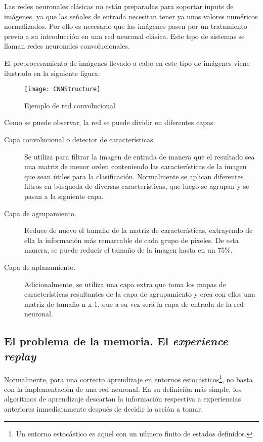\documentclass[11pt,spanish,listoffigures,listoftables]{tfgetsinf}
\begin{document}
Las redes neuronales clásicas no están preparadas para soportar inputs de imágenes, ya que las señales de entrada necesitan tener ya unos valores numéricos normalizados. Por ello es necesario que las imágenes pasen por un tratamiento previo a su introducción en una red neuronal clásica. Este tipo de sistemas se llaman redes neuronales convolucionales.

El preprocesamiento de imágenes llevado a cabo en este tipo de imágenes viene ilustrado en la siguiente figura:

\begin{figure}[h]
	\centering
	\texttt{[image: CNNStructure]}
	\caption{Ejemplo de red convolucional}
	
\end{figure}

Como se puede observar, la red se puede dividir en diferentes capas:

\begin{description}
	\item[Capa convolucional o detector de características.] Se utiliza para filtrar la imagen de entrada de manera que el resultado sea una matriz de menor orden conteniendo las características de la imagen que sean útiles para la clasificación. Normalmente se aplican diferentes filtros en búsqueda de diversas características, que luego se agrupan y se pasan a la siguiente capa.
	\item [Capa de agrupamiento.] Reduce de nuevo el tamaño de la matriz de características, extrayendo de ella la información más remarcable de cada grupo de píxeles. De esta manera, se puede reducir el tamaño de la imagen hasta en un 75\%.
	\item[Capa de aplanamiento.] Adicionalmente, se utiliza una capa extra que toma los mapas de características resultantes de la capa de agrupamiento y crea con ellos una matriz de tamaño n x 1, que a su vez será la capa de entrada de la red neuronal.
\end{description}

\subsection{El problema de la memoria. El \textit{experience replay}}

Normalmente, para una correcto aprendizaje en entornos estocásticos\footnote{Un entorno estocástico es aquel con un número finito de estados definidos.}, no basta con la implementación de una red neuronal. En su definición más simple, los algoritmos de aprendizaje descartan la información respectiva a experiencias anteriores inmediatamente después de decidir la acción a tomar.
\end{document}
